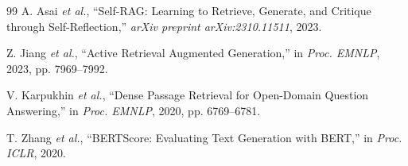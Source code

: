 \documentclass[12pt, a4paper]{article}
\begin{document}
\begin{thebibliography}{99}
A. Asai \textit{et al.},
``Self-RAG: Learning to Retrieve, Generate, and Critique through Self-Reflection,''
\textit{arXiv preprint arXiv:2310.11511}, 2023.

Z. Jiang \textit{et al.},
``Active Retrieval Augmented Generation,''
in \textit{Proc. EMNLP}, 2023, pp. 7969--7992.

V. Karpukhin \textit{et al.},
``Dense Passage Retrieval for Open-Domain Question Answering,''
in \textit{Proc. EMNLP}, 2020, pp. 6769--6781.

T. Zhang \textit{et al.},
``BERTScore: Evaluating Text Generation with BERT,''
in \textit{Proc. ICLR}, 2020.

\end{thebibliography}
\end{document}
